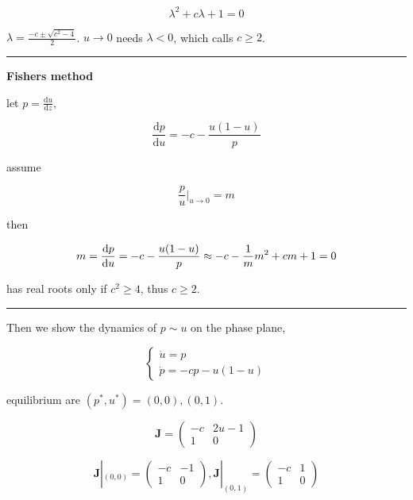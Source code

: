 \documentclass[
]{article}
\begin{document}
\begin{equation*}
\lambda ^2 + c \lambda + 1 =0
\end{equation*}

$\lambda = \frac{- c \pm \sqrt{c^2 - 4}}{2}$. $u \rightarrow 0$
needs $\lambda <0$, which calls $c \geq 2$.

\begin{center}\rule{0.5\linewidth}{0.5pt}\end{center}

\textbf{Fisher\textquotesingle s method}

let $p = \frac{\mathrm{d} u}{\mathrm{d} z}$,

\begin{equation*}
\frac{\mathrm{d}p} {\mathrm{d}u} = -c - \frac{u(1-u)}{p}
\end{equation*}

assume

\begin{equation*}
\frac{p}{u}|_{u\rightarrow0} = m
\end{equation*}

then

\begin{equation*}
m = \frac{\mathrm{d}p} {\mathrm{d}u} = -c - \frac{u(1-u)}{p} \approx -c - \frac{1}{m}\\
m^2+cm+1 = 0
\end{equation*}

has real roots only if $c^2\geq4$, thus $c \geq 2$.

\begin{center}\rule{0.5\linewidth}{0.5pt}\end{center}

Then we show the dynamics of $p\sim u$ on the phase plane,

$$
\begin{cases}
\dot{u} = p\\
\dot{p} = -cp - u(1-u)
\end{cases}
$$

equilibrium are $(p^*,u^*) = (0,0), (0,1)$.

\begin{equation*}
\mathbf{J} = \begin{pmatrix}
-c & 2u-1\\
1 & 0
\end{pmatrix}
\end{equation*}

\begin{equation*}
\mathbf{J}|_{(0,0)} = \begin{pmatrix}
-c & -1\\
1 & 0
\end{pmatrix}, 
\mathbf{J}|_{(0,1)} = \begin{pmatrix}
-c & 1\\
1 & 0
\end{pmatrix}
\end{equation*}
\end{document}
